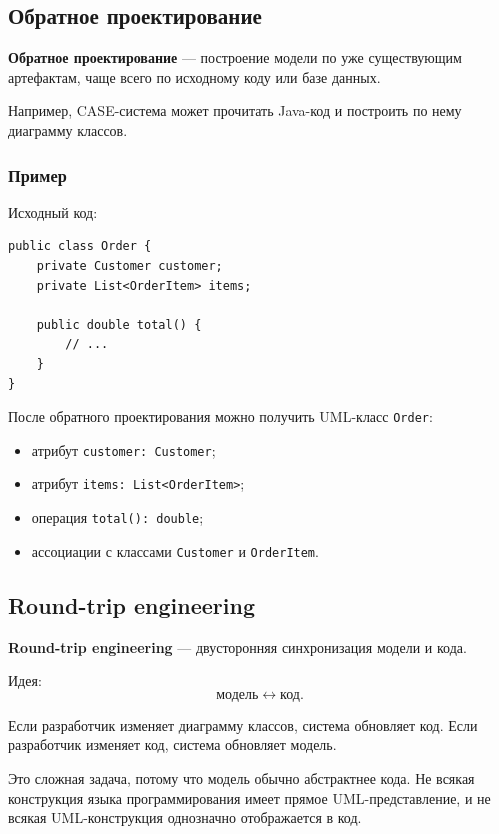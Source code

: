 \documentclass[12pt,a4paper]{article}
\begin{document}
\subsection{Обратное проектирование}

\textbf{Обратное проектирование} --- построение модели по уже существующим артефактам, чаще всего по исходному коду или базе данных.

Например, CASE-система может прочитать Java-код и построить по нему диаграмму классов.

\subsubsection{Пример}

Исходный код:

\begin{verbatim}
public class Order {
    private Customer customer;
    private List<OrderItem> items;

    public double total() {
        // ...
    }
}
\end{verbatim}

После обратного проектирования можно получить UML-класс \texttt{Order}:
\begin{itemize}
    \item атрибут \texttt{customer: Customer};
    \item атрибут \texttt{items: List<OrderItem>};
    \item операция \texttt{total(): double};
    \item ассоциации с классами \texttt{Customer} и \texttt{OrderItem}.
\end{itemize}

\subsection{Round-trip engineering}

\textbf{Round-trip engineering} --- двусторонняя синхронизация модели и кода.

Идея:
\[
\text{модель} \leftrightarrow \text{код}.
\]

Если разработчик изменяет диаграмму классов, система обновляет код. Если разработчик изменяет код, система обновляет модель.

Это сложная задача, потому что модель обычно абстрактнее кода. Не всякая конструкция языка программирования имеет прямое UML-представление, и не всякая UML-конструкция однозначно отображается в код.
\end{document}
